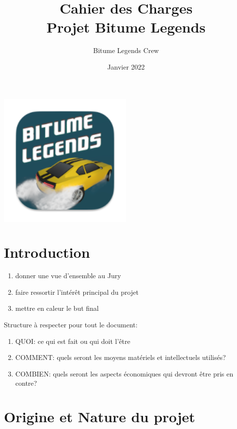 \documentclass[11pt,a4paper]{article}
\begin{document}
\title{Cahier des Charges \\ Projet Bitume Legends}
\author{Bitume Legends Crew}
\date{Janvier 2022}
\maketitle

\begin{center}
    \includegraphics[width=0.5\textwidth]{Medias/logo192.png}
\end{center}

\tableofcontents
\clearpage

\section{Introduction}
  \begin{enumerate}
    \item donner une vue d'ensemble au Jury
    \item faire ressortir l'intérêt principal du projet
    \item mettre en caleur le but final
  \end{enumerate}
  Structure à respecter pour tout le document:
  \begin{enumerate}
    \item QUOI: ce qui est fait ou qui doit l'être
    \item COMMENT: quels seront les moyens matériels et intellectuels utilisés?
    \item COMBIEN: quels seront les aspects économiques qui devront être pris en contre?
  \end{enumerate}
\clearpage

\section{Origine et Nature du projet}
\clearpage
\end{document}
